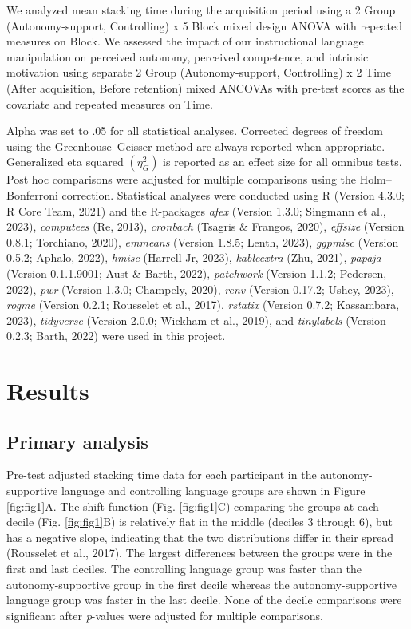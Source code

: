 \documentclass[
  doc, donotrepeattitle,floatsintext]{apa7}
\begin{document}
We analyzed mean stacking time during the acquisition period using a 2 Group (Autonomy-support, Controlling) x 5 Block mixed design ANOVA with repeated measures on Block. We assessed the impact of our instructional language manipulation on perceived autonomy, perceived competence, and intrinsic motivation using separate 2 Group (Autonomy-support, Controlling) x 2 Time (After acquisition, Before retention) mixed ANCOVAs with pre-test scores as the covariate and repeated measures on Time.

Alpha was set to .05 for all statistical analyses. Corrected degrees of freedom using the Greenhouse--Geisser method are always reported when appropriate. Generalized eta squared \((\eta_{G}^{2})\) is reported as an effect size for all omnibus tests. Post hoc comparisons were adjusted for multiple comparisons using the Holm--Bonferroni correction. Statistical analyses were conducted using R (Version 4.3.0; R Core Team, 2021) and the R-packages \emph{afex} (Version 1.3.0; Singmann et al., 2023), \emph{computees} (Re, 2013), \emph{cronbach} (Tsagris \& Frangos, 2020), \emph{effsize} (Version 0.8.1; Torchiano, 2020), \emph{emmeans} (Version 1.8.5; Lenth, 2023), \emph{ggpmisc} (Version 0.5.2; Aphalo, 2022), \emph{hmisc} (Harrell Jr, 2023), \emph{kableextra} (Zhu, 2021), \emph{papaja} (Version 0.1.1.9001; Aust \& Barth, 2022), \emph{patchwork} (Version 1.1.2; Pedersen, 2022), \emph{pwr} (Version 1.3.0; Champely, 2020), \emph{renv} (Version 0.17.2; Ushey, 2023), \emph{rogme} (Version 0.2.1; Rousselet et al., 2017), \emph{rstatix} (Version 0.7.2; Kassambara, 2023), \emph{tidyverse} (Version 2.0.0; Wickham et al., 2019), and \emph{tinylabels} (Version 0.2.3; Barth, 2022) were used in this project.

\hypertarget{results}{%
\section{Results}\label{results}}

\hypertarget{primary-analysis-1}{%
\subsection{Primary analysis}\label{primary-analysis-1}}

Pre-test adjusted stacking time data for each participant in the autonomy-supportive language and controlling language groups are shown in Figure \ref{fig:fig1}A. The shift function (Fig. \ref{fig:fig1}C) comparing the groups at each decile (Fig. \ref{fig:fig1}B) is relatively flat in the middle (deciles 3 through 6), but has a negative slope, indicating that the two distributions differ in their spread (Rousselet et al., 2017). The largest differences between the groups were in the first and last deciles. The controlling language group was faster than the autonomy-supportive group in the first decile whereas the autonomy-supportive language group was faster in the last decile. None of the decile comparisons were significant after \emph{p}-values were adjusted for multiple comparisons.
\end{document}
